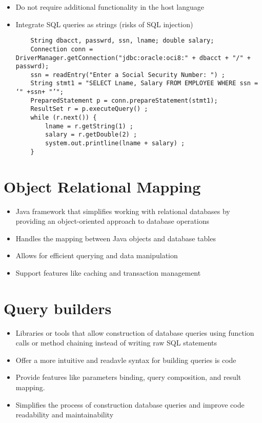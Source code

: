 \begin{itemize}
    \item Do not require additional functionality in the host language
    \item Integrate SQL queries as strings (risks of SQL injection)
    \begin{verbatim}
    String dbacct, passwrd, ssn, lname; double salary;
    Connection conn = DriverManager.getConnection("jdbc:oracle:oci8:" + dbacct + "/" + passwrd);
    ssn = readEntry("Enter a Social Security Number: ") ;
    String stmt1 = "SELECT Lname, Salary FROM EMPLOYEE WHERE ssn = ‘" +ssn+ "’";
    PreparedStatement p = conn.prepareStatement(stmt1);
    ResultSet r = p.executeQuery() ;
    while (r.next()) {
        lname = r.getString(1) ;
        salary = r.getDouble(2) ;
        system.out.printline(lname + salary) ;
    }
    \end{verbatim}
\end{itemize}

\section{Object Relational Mapping}

\begin{itemize}
    \item Java framework that simplifies working with relational databases by providing an object-oriented approach to database operations
    \item Handles the mapping between Java objects and database tables
    \item Allows for efficient querying and data manipulation
    \item Support features like caching and transaction management
\end{itemize}

\newpage
\section{Query builders}

\begin{itemize}
    \item Libraries or tools that allow construction of database queries using function calls or method chaining instead of writing raw SQL statements
    \item Offer a more intuitive and readavle syntax for building queries is code
    \item Provide features like parameters binding, query composition, and result mapping.
    \item Simplifies the process of construction database queries and improve code readability and maintainability
\end{itemize}

